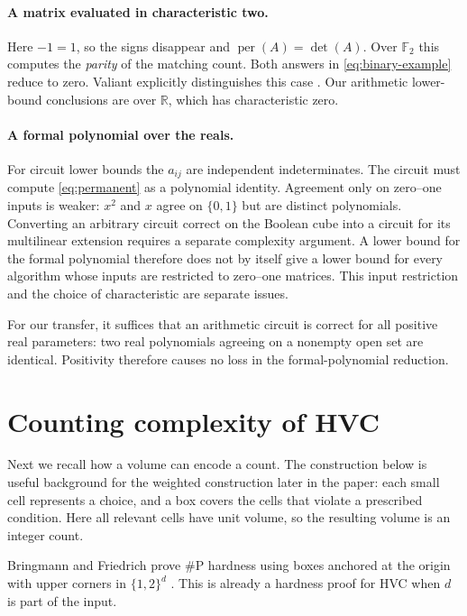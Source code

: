 \documentclass[12pt,a4paper]{article}
\theoremstyle{definition}
\theoremstyle{remark}
\newcommand{\R}{\mathbb R}
\newcommand{\F}{\mathbb F}
\newcommand{\per}{\operatorname{per}}
\begin{document}
\paragraph{A matrix evaluated in characteristic two.}
Here $-1=1$, so the signs disappear and
$\per(A)=\det(A)$. Over $\F_2$ this computes the \emph{parity} of the
matching count. Both answers in \eqref{eq:binary-example} reduce to zero.
Valiant explicitly distinguishes this case \cite[Theorem 3]{ValiantCounting}.
Our arithmetic lower-bound conclusions are over $\R$, which has
characteristic zero.

\paragraph{A formal polynomial over the reals.}
For circuit lower bounds the $a_{ij}$ are independent indeterminates.
The circuit must compute \eqref{eq:permanent} as a polynomial identity.
Agreement only on zero--one inputs is weaker: $x^2$ and $x$ agree on
$\{0,1\}$ but are distinct polynomials. Converting an arbitrary circuit
correct on the Boolean cube into a circuit for its multilinear extension
requires a separate complexity argument. A lower bound for the formal
polynomial therefore does not by itself give a lower bound for every
algorithm whose inputs are restricted to zero--one matrices. This
input restriction and the choice of characteristic are separate issues.

For our transfer, it suffices that an arithmetic circuit is correct for
all positive real parameters: two real polynomials agreeing on a
nonempty open set are identical. Positivity therefore causes no loss in
the formal-polynomial reduction.

\section{Counting complexity of HVC}
\label{sec:bf}

Next we recall how a volume can encode a count. The construction below
is useful background for the weighted construction later in the paper:
each small cell represents a choice, and a box covers the cells that
violate a prescribed condition. Here all relevant cells have unit
volume, so the resulting volume is an integer count.

Bringmann and Friedrich prove $\#\mathrm P$ hardness using boxes anchored
at the origin with upper corners in $\{1,2\}^d$
\cite[Theorem 1]{BringmannFriedrich}. This is already a hardness proof for
HVC when $d$ is part of the input.
\end{document}
